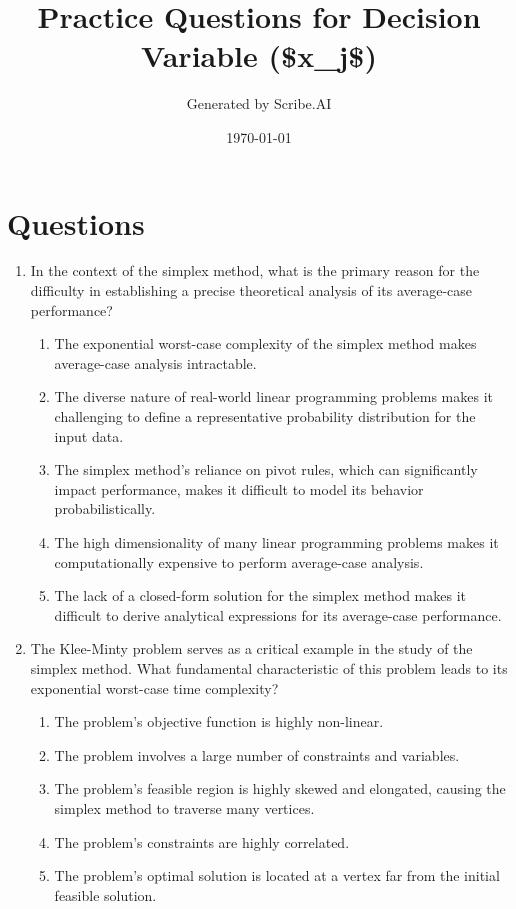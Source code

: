 \documentclass{article}%
\title{Practice Questions for Decision Variable (\$x\_j\$)}%
\author{Generated by Scribe.AI}%
\date{\today}%
\begin{document}
%
\normalsize%
\maketitle%
\section{Questions}%
\label{sec:Questions}%
\begin{enumerate}%
\item In the context of the simplex method, what is the primary reason for the difficulty in establishing a precise theoretical analysis of its average-case performance?%
\begin{enumerate}%
\item The exponential worst-case complexity of the simplex method makes average-case analysis intractable.%
\item The diverse nature of real-world linear programming problems makes it challenging to define a representative probability distribution for the input data.%
\item The simplex method's reliance on pivot rules, which can significantly impact performance, makes it difficult to model its behavior probabilistically.%
\item The high dimensionality of many linear programming problems makes it computationally expensive to perform average-case analysis.%
\item The lack of a closed-form solution for the simplex method makes it difficult to derive analytical expressions for its average-case performance.%
\end{enumerate}%
\vspace{1em}%
\item The Klee-Minty problem serves as a critical example in the study of the simplex method. What fundamental characteristic of this problem leads to its exponential worst-case time complexity?%
\begin{enumerate}%
\item The problem's objective function is highly non-linear.%
\item The problem involves a large number of constraints and variables.%
\item The problem's feasible region is highly skewed and elongated, causing the simplex method to traverse many vertices.%
\item The problem's constraints are highly correlated.%
\item The problem's optimal solution is located at a vertex far from the initial feasible solution.%

\end{enumerate}
\end{enumerate}
\end{document}

